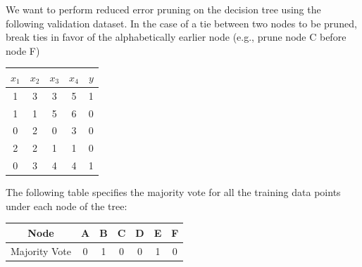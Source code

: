 \documentclass[11pt,addpoints,answers]{exam}
\begin{document}
\begin{questions}
\begin{parts}
\begin{center}
    \end{center}
    
    We want to perform reduced error pruning on the decision tree using the following validation dataset. In the case of a tie between two nodes to be pruned, break ties in favor of the alphabetically earlier node (e.g., prune node C before node F)

    \begin{center}
    \begin{tabular}{||c|c|c|c||c||}
        \hline
         $x_1$ & $x_2$ & $x_3$ & $x_4$ & $y$ \\
         \hline
        1 & 3 & 3 & 5 & 1 \\
        \hline
        1 & 1 & 5 & 6 & 0 \\
        \hline
        0 & 2 & 0 & 3 & 0 \\
        \hline
        2 & 2 & 1 & 1 & 0 \\
        \hline
        0 & 3 & 4 & 4 & 1 \\
        \hline
    \end{tabular}
    \end{center}

    The following table specifies the majority vote for all the training data points under each node of the tree:

    \begin{center}
    \begin{tabular}{|c||c|c|c|c|c|c|}
        \hline
        Node & A & B & C & D & E & F \\
        \hline
        Majority Vote & 0 & 1 & 0 & 0 & 1 & 0 \\
        \hline
    \end{tabular}
    \end{center}


\end{parts}
\end{questions}
\end{document}

